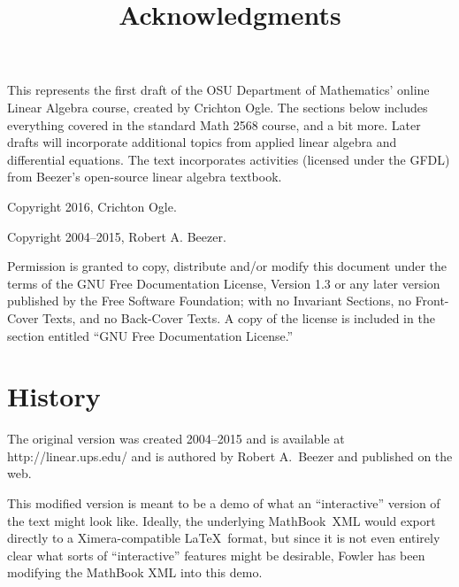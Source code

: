 \documentclass{ximera}
\title{Acknowledgments}
\begin{document}
\begin{abstract}
\end{abstract}
\maketitle

This represents the first draft of the OSU Department of Mathematics'
online Linear Algebra course, created by Crichton Ogle. The sections
below includes everything covered in the standard Math 2568 course,
and a bit more. Later drafts will incorporate additional topics from
applied linear algebra and differential equations.  The text
incorporates activities (licensed under the GFDL) from Beezer's
open-source linear algebra textbook.

Copyright 2016, Crichton Ogle.

Copyright 2004--2015, Robert A. Beezer.

Permission is granted to copy, distribute and/or modify this document
under the terms of the GNU Free Documentation License, Version 1.3 or
any later version published by the Free Software Foundation; with no
Invariant Sections, no Front-Cover Texts, and no Back-Cover Texts.  A
copy of the license is included in the section entitled ``GNU Free
Documentation License.''

\section{History}   

The original version was created 2004--2015 and is available at
http://linear.ups.edu/ and is authored by Robert A.~Beezer and
published on the web.

This modified version is meant to be a demo of what an ``interactive''
version of the text might look like.  Ideally, the underlying
MathBook~XML would export directly to a Ximera-compatible \LaTeX\
format, but since it is not even entirely clear what sorts of
``interactive'' features might be desirable, Fowler has been modifying
the MathBook XML into this demo.
\end{document}
